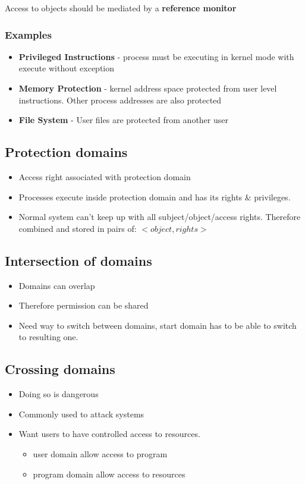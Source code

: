 \documentclass{article}
\newcommand\tab[1][0.5cm]{\hspace*{#1}}
\begin{document}
		Access to objects should be mediated by a \textbf{reference monitor}
		
		\subsubsection{Examples}
			\begin{itemize}
				\item \textbf{Privileged Instructions} - process must be executing in kernel mode with execute without exception
				\item \textbf{Memory Protection} - kernel address space protected from user level instructions. Other process addresses are also protected
				\item \textbf{File System} - User files are protected from another user
			\end{itemize}
			
	\subsection{Protection domains}
		\begin{itemize}
			\item Access right associated with protection domain
			\item Processes execute inside protection domain and has its rights \& privileges.
			\item Normal system can't keep up with all subject/object/access rights. Therefore combined and stored in pairs of: \tab $<object, rights>$
		\end{itemize}
		
	\subsection{Intersection of domains}
		\begin{itemize}
			\item Domains can overlap
			\item Therefore permission can be shared
			\item Need way to switch between domains, start domain has to be able to switch to resulting one.
		\end{itemize}
		
	\subsection{Crossing domains}	
		\begin{itemize}
			\item Doing so is dangerous
			\item Commonly used to attack systems
			\item Want users to have controlled access to resources.
			\begin{itemize}
				\item user domain allow access to program
				\item program domain allow access to resources
			\end{itemize}
		\end{itemize}
		
\end{document}
